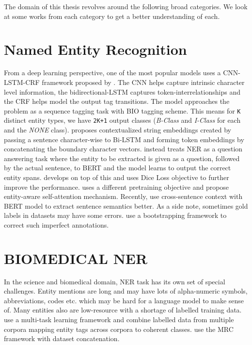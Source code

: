The domain of this thesis revolves around the following broad categories. We look at some works from each category to get a better understanding of each.

\section{Named Entity Recognition}
From a deep learning perspective, one of the most popular models uses a CNN-LSTM-CRF framework proposed by \cite{ma2016end}. The CNN helps capture intrinsic character level information, the bidirectional-LSTM captures token-interrelationships and the CRF helps model the output tag transitions. The model approaches the problem as a sequence tagging task with BIO tagging scheme. This means for \texttt{K} distinct entity types, we have \texttt{2K+1} output classes (\textit{B-Class} and \textit{I-Class} for each and the \textit{NONE} class). \cite{akbik2018contextual} proposes contextualized string embeddings created by passing a sentence character-wise to Bi-LSTM and forming token embeddings by concatenating the boundary character vectors. \cite{li2019unified} instead treats NER as a question answering task where the entity to be extracted is given as a question, followed by the actual sentence, to BERT \cite{devlin2018bert} and the model learns to output the correct entity spans. \cite{li2019dice} develops on top of this and uses Dice Loss objective to further improve the performance. \cite{yamada2020luke} uses a different pretraining objective and propose entity-aware self-attention mechanism. Recently, \cite{luoma2020exploring} use cross-sentence context with BERT model to extract sentence semantics better. As a side note, sometimes gold labels in datasets may have some errors. \cite{wang2019crossweigh} use a bootstrapping framework to correct such imperfect annotations.

\section{BIOMEDICAL NER}
In the science and biomedical domain, NER task has its own set of special challenges. Entity mentions are long and may have lots of alpha-numeric symbols, abbreviations, codes etc. which may be hard for a language model to make sense of. Many entities also are low-resource with a shortage of labelled training data. \cite{wang2019cross} use a multi-task learning framework and combine labelled data from multiple corpora mapping entity tags across corpora to coherent classes. \cite{banerjee2019knowledge} use the MRC framework with dataset concatenation.

